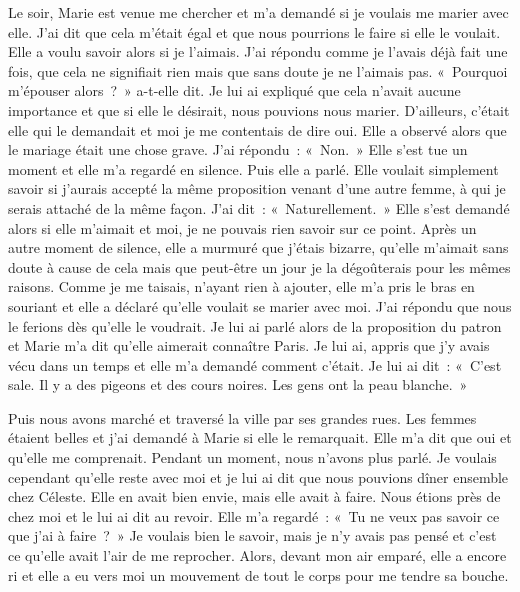 \documentclass[french,twoside]{book} %
\begin{document}
Le soir, Marie est venue me chercher et m’a demandé si je voulais me marier avec elle. J'ai dit que cela m’était égal et que nous pourrions le faire si elle le voulait. Elle a voulu savoir alors si je l’aimais. J'ai répondu comme je l’avais déjà fait une fois, que cela ne signifiait rien mais que sans doute je ne l’aimais pas. « Pourquoi m’épouser alors ? » a-t-elle dit. Je lui ai expliqué que cela n’avait aucune importance et que si elle le désirait, nous pouvions nous marier. D'ailleurs, c’était elle qui le demandait et moi je me contentais de dire oui. Elle a observé alors que le mariage était une chose grave. J'ai répondu : « Non. » Elle s’est tue un moment et elle m’a regardé en silence. Puis elle a parlé. Elle voulait simplement savoir si j’aurais accepté la même proposition venant d’une autre femme, à qui je serais attaché de la même façon. J'ai dit : « Naturellement. » Elle s’est demandé alors si elle m’aimait et moi, je ne pouvais rien savoir sur ce point. Après un autre moment de silence, elle a murmuré que j’étais bizarre, qu’elle m’aimait sans doute à cause de cela mais que peut-être un jour je la dégoûterais pour les mêmes raisons. Comme je me taisais, n’ayant rien à ajouter, elle m’a pris le bras en souriant et elle a déclaré qu’elle voulait se marier avec moi. J'ai répondu que nous le ferions dès qu’elle le voudrait. Je lui ai parlé alors de la proposition du patron et Marie m’a dit qu’elle aimerait connaître Paris. Je lui ai, appris que j’y avais vécu dans un temps et elle m’a demandé comment c’était. Je lui ai dit : « C'est sale. Il y a des pigeons et des cours noires. Les gens ont la peau blanche. »\par
Puis nous avons marché et traversé la ville par ses grandes rues. Les femmes étaient belles et j’ai demandé à Marie si elle le remarquait. Elle m’a dit que oui et qu’elle me comprenait. Pendant un moment, nous n’avons plus parlé. Je voulais cependant qu’elle reste avec moi et je lui ai dit que nous pouvions dîner ensemble chez Céleste. Elle en avait bien envie, mais elle avait à faire. Nous étions près de chez moi et le lui ai dit au revoir. Elle m’a regardé : « Tu ne veux pas savoir ce que j’ai à faire ? » Je voulais bien le savoir, mais je n’y avais pas pensé et c’est ce qu’elle avait l’air de me reprocher. Alors, devant mon air emparé, elle a encore ri et elle a eu vers moi un mouvement de tout le corps pour me tendre sa bouche.\par
\end{document}
